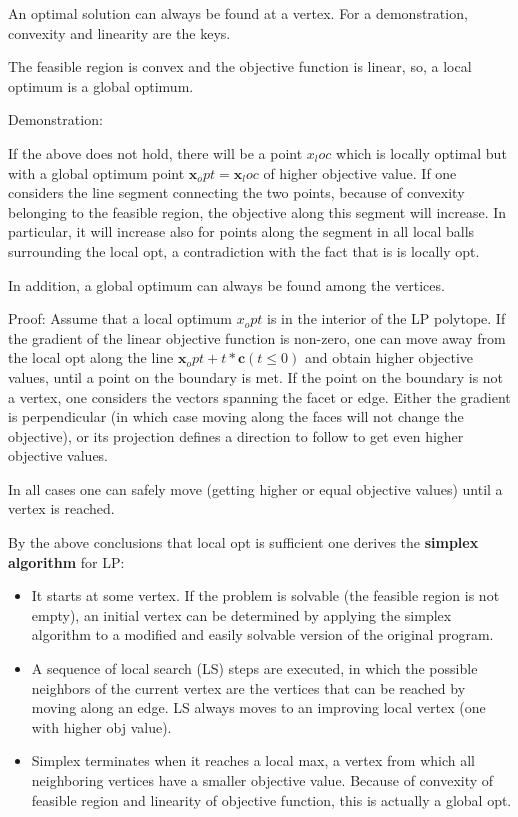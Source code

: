 \documentclass[11pt]{article}
\begin{document}
An optimal solution can always be found at a vertex. For a demonstration, convexity and linearity are the keys.

The feasible region is convex and the objective function is linear, so, a local optimum is a global optimum. 

Demonstration:
 
If the above does not hold, there will be a point $ x_loc $ which is locally optimal but with a global optimum point $ \textbf{x}_opt = \textbf{x}_loc $ of higher objective value. If one considers the line segment connecting the two points, because of convexity belonging to the feasible region, the objective along this segment will increase. In particular, it will increase also for points along the segment in all local balls surrounding the local opt, a contradiction with the fact that is is locally opt.

In addition, a global optimum can always be found among the vertices.

Proof: 
Assume that a local optimum $ x_opt $ is in the interior of the LP polytope. If the gradient of the linear objective function is non-zero, one can move away from the local opt along the line $ \textbf{x}_opt + t*\textbf{c} (t \leq 0) $ and obtain higher objective values, until a point on the boundary is met. If the point on the boundary is not a vertex, one considers the vectors spanning the facet or edge. Either the gradient is perpendicular (in which case moving along the faces will not change the objective), or its projection defines a direction to follow to get even higher objective values. 

In all cases one can safely move (getting higher or equal objective values) until a vertex is reached.

By the above conclusions that local opt is sufficient one derives the \textbf{simplex algorithm} for LP:

\begin{itemize}
\item It starts at some vertex. If the problem is solvable (the feasible region is not empty), an initial vertex can be determined by applying the simplex algorithm to a modified and easily solvable version of the original program. 
\item A sequence of local search (LS) steps are executed, in which the possible neighbors of the current vertex are the vertices that can be reached by moving along an edge. LS always moves to an improving local vertex (one with higher obj value).
\item Simplex terminates when it reaches a local max, a vertex from which all neighboring vertices have a smaller objective value. Because of convexity of feasible region and linearity of objective function, this is actually a global opt.
\end{itemize}
\end{document}
